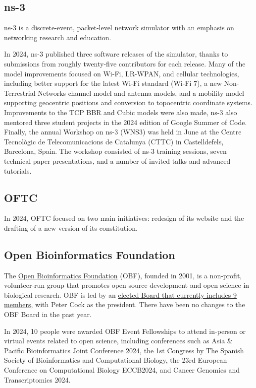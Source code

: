 \documentclass[a4paper]{report}
\begin{document}
\subsection{ns-3}

ns-3 is a discrete-event, packet-level network simulator with an emphasis on networking research and education.

In 2024, ns-3 published three software releases of the simulator, thanks to submissions from roughly twenty-five contributors for each release. Many of the model improvements focused on Wi-Fi, LR-WPAN, and cellular technologies, including better support for the latest Wi-Fi standard (Wi-Fi 7), a new Non-Terrestrial Networks channel model and antenna models, and a mobility model supporting geocentric positions and conversion to topocentric coordinate systems. Improvements to the TCP BBR and Cubic models were also made,  ns-3 also mentored three student projects in the 2024 edition of Google Summer of Code. Finally, the annual Workshop on ns-3 (WNS3) was held in June at the Centre Tecnològic de Telecomunicacions de Catalunya (CTTC) in Castelldefels, Barcelona, Spain.  The workshop consisted of ns-3 training sessions, seven technical paper presentations, and a number of invited talks and advanced tutorials.

\subsection{OFTC}

In 2024, OFTC focused on two main initiatives: redesign of its website and the drafting of a new version of its constitution.

\subsection{Open Bioinformatics Foundation}

The \href{https://www.open-bio.org/}{Open Bioinformatics Foundation} (OBF), founded in 2001, is a non-profit, volunteer-run group that promotes open source development and open science in biological research. OBF is led by an \href{https://www.open-bio.org/board/}{elected Board that currently includes 9 members}, with Peter Cock as the president. There have been no changes to the OBF Board in the past year.

In 2024, 10 people were awarded OBF Event Fellowships to attend in-person or virtual events related to open science, including conferences such as Asia \& Pacific Bioinformatics Joint Conference 2024, the 1st Congress by The Spanish Society of Bioinformatics and Computational Biology, the 23rd European Conference on Computational Biology ECCB2024, and Cancer Genomics and Transcriptomics 2024.
\end{document}
